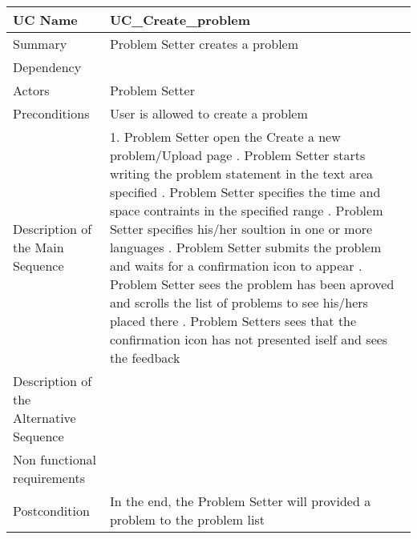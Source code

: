 \begin{table}[htbp]
\centering
\begin{tabularx}{\textwidth}{|l|X|}
\hline
UC Name & UC\_Create\_problem \\ \hline

Summary &  Problem Setter creates a problem \\ \hline

Dependency & \- \\ \hline

Actors & Problem Setter \\ \hline

Preconditions & User is allowed to create a problem \\ \hline

Description of the Main Sequence & 1.	Problem Setter open the Create a new problem/Upload page  \newline  2. Problem Setter starts writing the problem statement in the text area specified \newline 3.  Problem Setter specifies the time and space contraints in the specified range \newline 4. Problem Setter specifies his/her soultion in one or more languages \newline 5. Problem Setter submits the problem and waits for a confirmation icon to appear \newline 6. Problem Setter sees the problem has been aproved and scrolls the list of problems to see his/hers placed there \newline 7. Problem Setters sees that the confirmation icon has not presented iself and sees the feedback \\ \hline

Description of the Alternative Sequence & \- \\ \hline

Non functional requirements & \- \\ \hline

Postcondition & In the end, the Problem Setter will provided a problem to the problem list \\ \hline

\end{tabularx}
\end{table}

